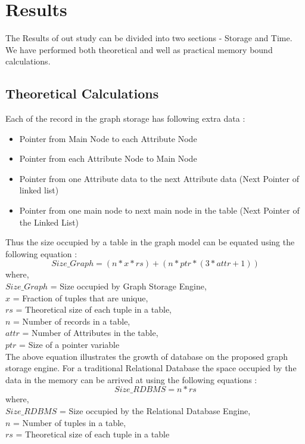 \documentclass[12pt, oneside]{book}
\begin{document}
\section{Results}
The Results of out study can be divided into two sections - Storage and Time. We have performed both theoretical and well as practical memory bound calculations. \\
\subsection{Theoretical Calculations}
Each of the record in the graph storage has following extra data :
\begin{itemize}
 \item Pointer from Main Node to each Attribute Node
 \item Pointer from each Attribute Node to Main Node
 \item Pointer from one Attribute data to the next Attribute data (Next Pointer of linked list)
 \item Pointer from one main node to next main node in the table (Next Pointer of the Linked List)
\end{itemize}
Thus the size occupied by a table in the graph model can be equated using the following equation :
\begin{equation}
  Size\_Graph = (n * x * rs) + (n * ptr * (3 * attr + 1))
  \label{grsize}
\end{equation}
where, \\
$Size\_Graph$ = Size occupied by Graph Storage Engine, \\
$x$ = Fraction of tuples that are unique, \\
$rs$ = Theoretical size of each tuple in a table, \\
$n$ = Number of records in a table, \\
$attr$ = Number of Attributes in the table, \\
$ptr$ = Size of a pointer variable \\

The above equation illustrates the growth of database on the proposed graph storage engine. For a traditional Relational Database the space occupied by the data in the memory can be arrived at using the following equations :
\begin{equation}
 Size\_RDBMS = n * rs
 \label{rdbmssize}
\end{equation}
where, \\
$Size\_RDBMS$ = Size occupied by the Relational Database Engine, \\
$n$ = Number of tuples in a table, \\
$rs$ = Theoretical size of each tuple in a table \\
\end{document}
